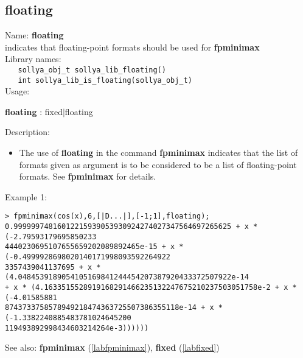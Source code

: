 \subsection{floating}
\label{labfloating}
\noindent Name: \textbf{floating}\\
\phantom{aaa}indicates that floating-point formats should be used for \textbf{fpminimax}\\[0.2cm]
\noindent Library names:\\
\verb|   sollya_obj_t sollya_lib_floating()|\\
\verb|   int sollya_lib_is_floating(sollya_obj_t)|\\[0.2cm]
\noindent Usage: 
\begin{center}
\textbf{floating} : \textsf{fixed$|$floating}\\
\end{center}
\noindent Description: \begin{itemize}

\item The use of \textbf{floating} in the command \textbf{fpminimax} indicates that the list of
   formats given as argument is to be considered to be a list of floating-point
   formats.
   See \textbf{fpminimax} for details.
\end{itemize}
\noindent Example 1: 
\begin{center}\begin{minipage}{15cm}\begin{Verbatim}[frame=single]
> fpminimax(cos(x),6,[|D...|],[-1;1],floating);
0.99999974816012215939053930924274027347564697265625 + x * (-2.79593179695850233
4440230695107655659202089892465e-15 + x * (-0.4999928698020140171998093592264922
3357439041137695 + x * (4.0484539189054105169841244454207387920433372507922e-14 
+ x * (4.1633515528919168291466235132247675210237503051758e-2 + x * (-4.01585881
8743733758578949218474363725507386355118e-14 + x * (-1.3382240885483781024645200
119493892998434603214264e-3))))))
\end{Verbatim}
\end{minipage}\end{center}
See also: \textbf{fpminimax} (\ref{labfpminimax}), \textbf{fixed} (\ref{labfixed})
